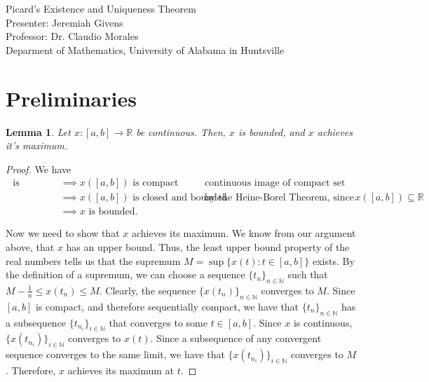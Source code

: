 \documentclass[10pt,a4paper]{article}
\author{Jeremiah Givens}
\theoremstyle{theorem}
\newtheorem{lemma}{Lemma}
\theoremstyle{definition}
\begin{document}
\begin{titlepage}
\vspace*{\fill}
\begin{center}
{\Huge Picard's Existence and Uniqueness Theorem}\\
Presenter: Jeremiah Givens\\
Professor: Dr. Claudio Morales\\
Deparment of Mathematics, University of Alabama in Huntsville
\end{center}
\vspace*{\fill}
\end{titlepage}

\section{Preliminaries}
\begin{lemma}
Let $x: [a, b] \to \mathbb{R}$ be continuous. Then, $x$ is bounded, and $x$ achieves it's maximum.
\end{lemma}

\begin{proof}
We have
\begin{align*}
[a, b] \text{ is compact} &\implies x([a, b]) \text{ is compact} && \text{continuous image of compact set}\\
&\implies x([a, b]) \text{ is closed and bounded} && \text{by the Heine-Borel Theorem, since } x([a, b]) \subseteq \mathbb{R}\\
&\implies x \text{ is bounded}.
\end{align*}

Now we need to show that $x$ achieves its maximum.  We know from our argument above, that $x$ has an upper bound. Thus, the least upper bound property of the real numbers tells us that the supremum $M = \sup \{x(t): t \in [a, b] \}$ exists. By the definition of a supremum, we can choose a sequence $\{t_n \}_{n \in \mathbb{N}}$ such that $M- \frac{1}{n} \leq x(t_n) \leq M$. Clearly, the sequence $\{x(t_n)\}_{n \in \mathbb{N}}$ converges to $M$. Since $[a, b]$ is compact, and therefore sequentially compact, we have that $\{t_n \}_{n \in \mathbb{N}}$ has a subsequence $\{t_{n_i} \}_{i \in \mathbb{N}}$ that converges to some $t \in [a, b]$. Since $x$ is continuous, $\{x(t_{n_i}) \}_{i \in \mathbb{N}}$ converges to $x(t)$. Since a subsequence of any convergent sequence converges to the same limit, we have that $\{x(t_{n_i}) \}_{i \in \mathbb{N}}$ converges to $M$. Therefore,  $x$ achieves its maximum at $t$.
\end{proof}
\end{document}
